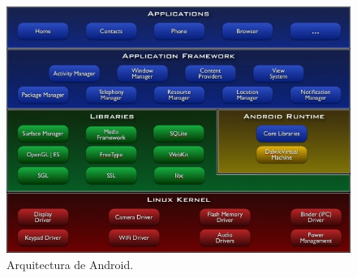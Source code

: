 \begin{figure}
  \centering
    \includegraphics[scale=0.6]{./Android/imagenes/arquitecturaAndroid.jpg}
  \caption{Arquitectura de Android.}
  \label{fig:arquitecturaAndroid}
\end{figure} 

